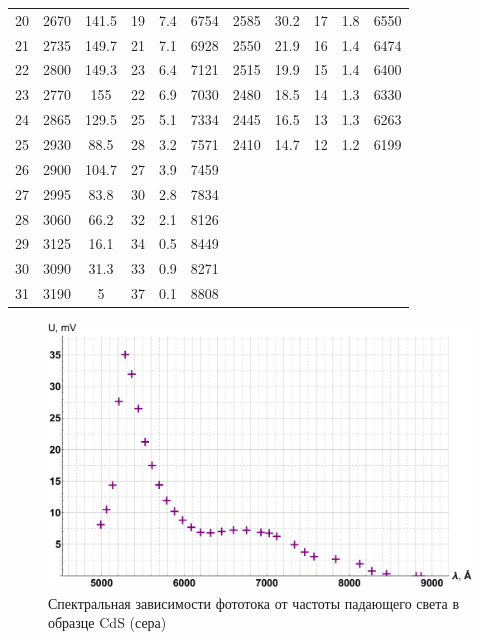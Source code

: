 \documentclass[12pt]{kiarticle}
\begin{document}
\begin{table}[h]
\begin{center}
\begin{tabular}{|c|ccccc|ccccc|}
				20 & 2670 & 141.5 & 19 & 7.4 & 6754 & 2585 & 30.2 & 17 & 1.8 & 6550 \\
				21 & 2735 & 149.7 & 21 & 7.1 & 6928 & 2550 & 21.9 & 16 & 1.4 & 6474 \\
				22 & 2800 & 149.3 & 23 & 6.4 & 7121 & 2515 & 19.9 & 15 & 1.4 & 6400 \\
				23 & 2770 & 155 & 22 & 6.9 & 7030 & 2480 & 18.5 & 14 & 1.3 & 6330 \\
				24 & 2865 & 129.5 & 25 & 5.1 & 7334 & 2445 & 16.5 & 13 & 1.3 & 6263 \\
				25 & 2930 & 88.5 & 28 & 3.2 & 7571 & 2410 & 14.7 & 12 & 1.2 & 6199 \\
				26 & 2900 & 104.7 & 27 & 3.9 & 7459 & \text{} & \text{} & \text{} & \text{} & \text{} \\
				27 & 2995 & 83.8 & 30 & 2.8 & 7834 & \text{} & \text{} & \text{} & \text{} & \text{} \\
				28 & 3060 & 66.2 & 32 & 2.1 & 8126 & \text{} & \text{} & \text{} & \text{} & \text{} \\
				29 & 3125 & 16.1 & 34 & 0.5 & 8449 & \text{} & \text{} & \text{} & \text{} & \text{} \\
				30 & 3090 & 31.3 & 33 & 0.9 & 8271 & \text{} & \text{} & \text{} & \text{} & \text{} \\
				31 & 3190 & 5 & 37 & 0.1 & 8808 & \text{} & \text{} & \text{} & \text{} & \text{} \\
				\hline
			\end{tabular}
		\end{center}
		\label{table_5}
	\end{table}

	\begin{figure}[h]

	\includegraphics[scale=0.47]{s.pdf}
	\caption{Спектральная зависимости фототока от частоты падающего света в образце CdS (сера)}
	\label{graf_s}
\end{figure}
\end{document}

